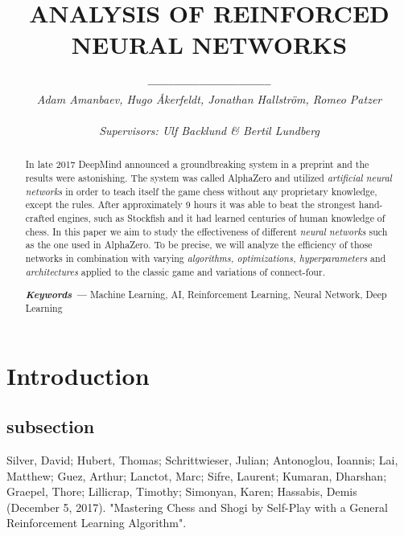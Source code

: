 \documentclass[titlepage]{article}
\title{\textbf{ANALYSIS OF REINFORCED \\NEURAL NETWORKS}}
\author{\textbf{\huge-----------------------------}\\[0.5in] \textit{Adam Amanbaev, Hugo Åkerfeldt, Jonathan Hallström, Romeo Patzer} \\\\
    \small \textit{Supervisors: Ulf Backlund \& Bertil Lundberg}
}
\date{}
\providecommand{\keywords}[1] { 
    \small
    \textbf{\textit{Keywords ---}} #1
}
\begin{document}
\maketitle

\newpage

\begin{abstract}
    In late 2017 DeepMind announced a groundbreaking system in a preprint \cite{alphazero} and the results were astonishing. The system was called AlphaZero and utilized \emph{artificial neural networks} in order to teach itself the game chess without any proprietary knowledge, except the rules. After approximately 9 hours it was able to beat the strongest hand-crafted engines, such as Stockfish and it had learned centuries of human knowledge of chess. In this paper we aim to study the effectiveness of different \emph{neural networks} such as the one used in AlphaZero. To be precise, we will analyze the efficiency of those networks in combination with varying \emph{algorithms, optimizations, hyperparameters} and \emph {architectures} applied to the classic game and variations of connect-four. \\[0.5in]
\centerline{\keywords{Machine Learning, AI, Reinforcement Learning, Neural Network, Deep Learning}} 
\end{abstract}

\tableofcontents

\newpage

\section{Introduction}

\subsection{subsection}


\begin{thebibliography}{100}
Silver, David; Hubert, Thomas; Schrittwieser, Julian; Antonoglou, Ioannis; Lai, Matthew; Guez, Arthur; Lanctot, Marc; Sifre, Laurent; Kumaran, Dharshan; Graepel, Thore; Lillicrap, Timothy; Simonyan, Karen; Hassabis, Demis (December 5, 2017). "Mastering Chess and Shogi by Self-Play with a General Reinforcement Learning Algorithm".

\end{thebibliography}
\end{document}
